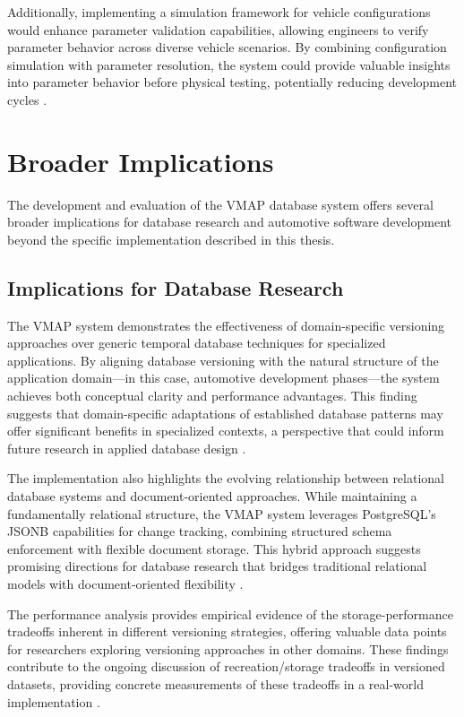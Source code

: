 Additionally, implementing a simulation framework for vehicle configurations would enhance parameter validation capabilities, allowing engineers to verify parameter behavior across diverse vehicle scenarios. By combining configuration simulation with parameter resolution, the system could provide valuable insights into parameter behavior before physical testing, potentially reducing development cycles \cite{staron2021automotive}.

\section{Broader Implications}
\label{sec:broader-implications}

The development and evaluation of the \ac{VMAP} database system offers several broader implications for database research and automotive software development beyond the specific implementation described in this thesis.

\subsection{Implications for Database Research}
\label{subsec:database-research-implications}

The \ac{VMAP} system demonstrates the effectiveness of domain-specific versioning approaches over generic temporal database techniques for specialized applications. By aligning database versioning with the natural structure of the application domain—in this case, automotive development phases—the system achieves both conceptual clarity and performance advantages. This finding suggests that domain-specific adaptations of established database patterns may offer significant benefits in specialized contexts, a perspective that could inform future research in applied database design \cite{bhattacherjee2015principles}.

The implementation also highlights the evolving relationship between relational database systems and document-oriented approaches. While maintaining a fundamentally relational structure, the \ac{VMAP} system leverages PostgreSQL's JSONB capabilities for change tracking, combining structured schema enforcement with flexible document storage. This hybrid approach suggests promising directions for database research that bridges traditional relational models with document-oriented flexibility \cite{obe2017postgresql}.

The performance analysis provides empirical evidence of the storage-performance tradeoffs inherent in different versioning strategies, offering valuable data points for researchers exploring versioning approaches in other domains. These findings contribute to the ongoing discussion of recreation/storage tradeoffs in versioned datasets, providing concrete measurements of these tradeoffs in a real-world implementation \cite{bhattacherjee2015principles}.

